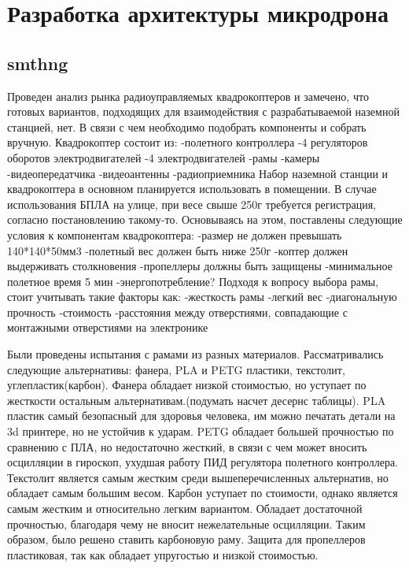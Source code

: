 
\section{Разработка архитектуры микродрона}
\subsection{smthng}
Проведен анализ рынка радиоуправляемых квадрокоптеров и замечено, что готовых вариантов, подходящих для взаимодействия с разрабатываемой наземной станцией, нет. В связи с чем необходимо подобрать компоненты и собрать вручную.
Квадрокоптер состоит из:
-полетного контроллера
-4 регуляторов оборотов электродвигателей
-4 электродвигателей
-рамы
-камеры
-видеопередатчика
-видеоантенны
-радиоприемника
Набор наземной станции и квадрокоптера в основном планируется использовать в помещении. В случае использования БПЛА на улице, при весе свыше 250г требуется регистрация, согласно постановлению такому-то. Основываясь на этом, поставлены следующие условия к компонентам квадрокоптера:
-размер не должен превышать 140*140*50мм3
-полетный вес должен быть ниже 250г
-коптер должен выдерживать столкновения
-пропеллеры должны быть защищены
-минимальное полетное время 5 мин
-энергопотребление?
Подходя к вопросу выбора рамы, стоит учитывать такие факторы как:
-жесткость рамы
-легкий вес
-диагональную прочность
-стоимость
-расстояния между отверстиями, совпадающие с монтажными отверстиями на электронике

Были проведены испытания с рамами из разных материалов. Рассматривались следующие альтернативы: фанера, PLA и PETG пластики, текстолит, углепластик(карбон). Фанера обладает низкой стоимостью, но уступает по жесткости остальным альтернативам.(подумать насчет десернс таблицы). PLA пластик самый безопасный для здоровья человека, им можно печатать детали на 3d принтере, но не устойчив к ударам. PETG обладает большей прочностью по сравнению с ПЛА, но недостаточно жесткий, в связи с чем может вносить осцилляции в гироскоп, ухудшая работу ПИД регулятора полетного контроллера. Текстолит является самым жестким среди вышеперечисленных альтернатив, но обладает самым большим весом. Карбон уступает по стоимости, однако является самым жестким и относительно легким вариантом. Обладает достаточной прочностью, благодаря чему не вносит нежелательные осцилляции. Таким образом, было решено ставить карбоновую раму.
Защита для пропеллеров пластиковая, так как обладает упругостью и низкой стоимостью.

